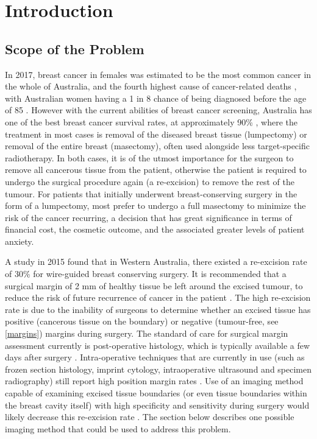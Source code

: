 \chapter{Introduction}
\acresetall

\section{Scope of the Problem}\label{problem}
In 2017, breast cancer in females was estimated to be the most common cancer in the whole of Australia, and the fourth highest cause of cancer-related deaths \cite{australian_institute_of_health_and_welfare_cancer_2017}, with Australian women having a 1 in 8 chance of being diagnosed before the age of 85 \cite{australian_institute_of_health_and_welfare_breast_2012}. However with the current abilities of breast cancer screening, Australia has one of the best breast cancer survival rates, at approximately 90\% \cite{australian_institute_of_health_and_welfare_breast_2012}, where the treatment in most cases is removal of the diseased breast tissue (lumpectomy) or removal of the entire breast (masectomy), often used alongside less target-specific radiotherapy. In both cases, it is of the utmost importance for the surgeon to remove all cancerous tissue from the patient, otherwise the patient is required to undergo the surgical procedure again (a re-excision) to remove the rest of the tumour. For patients that initially underwent breast-conserving surgery in the form of a lumpectomy, most prefer to undergo a full masectomy to minimize the risk of the cancer recurring, a decision that has great significance in terms of financial cost, the cosmetic outcome, and the associated greater levels of patient anxiety. 

A study in 2015 \cite{ballal_predictors_2015} found that in Western Australia, there existed a re-excision rate of 30\% for wire-guided breast conserving surgery. It is recommended that a surgical margin of 2 mm of healthy tissue be left around the excised tumour, to reduce the risk of future recurrence of cancer in the patient \cite{behm_surgical_2013}. The high re-excision rate is due to the inability of surgeons to determine whether an excised tissue has positive (cancerous tissue on the boundary) or negative (tumour-free, see \autoref{margins}) margins during surgery. The standard of care for surgical margin assessment currently is post-operative histology, which is typically available a few days after surgery \cite{allen_wide-field_2016}. Intra-operative techniques that are currently in use (such as frozen section histology, imprint cytology, intraoperative ultrasound and specimen radiography) still report high position margin rates \cite{cabioglu_role_2007}. Use of an imaging method capable of examining excised tissue boundaries (or even tissue boundaries within the breast cavity itself) with high specificity and sensitivity during surgery would likely decrease this re-excision rate \cite{ballal_predictors_2015}. The section below describes one possible imaging method that could be used to address this problem. 

